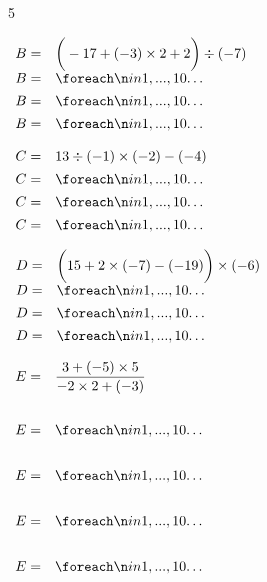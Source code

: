 \documentclass[a4paper]{book}
\begin{document}
{\begin{exerciceNote}{5}
\begin{minipage}{0.30\linewidth}
            $\begin{array}{ll}
                B = & \bigg(-17+(-3)\times2+2\bigg)\div(-7) \\[1ex]
                B = & \points[10]\\[1ex]
                B = & \points[10]\\[1ex]
                B = & \points[10]
            \end{array}$
        \end{minipage}
        \hfill
        \begin{minipage}{0.30\linewidth}
            $\begin{array}{ll}
                C = & 13\div(-1)\times(-2)-(-4) \\[1ex]
                C = & \points[10] \\[1ex]
                C = & \points[10] \\[1ex]
                C = & \points[10]
            \end{array}$

            \vspace{1cm}

            $\begin{array}{ll}
                D = & \bigg(15+2\times(-7)-(-19)\bigg)\times(-6) \\[1ex]
                D = & \points[10]\\[1ex]
                D = & \points[10]\\[1ex]
                D = & \points[10]
            \end{array}$
        \end{minipage}
        \hfill
        \begin{minipage}[t]{0.30\linewidth}
            $\begin{array}{ll}
                E = & \dfrac{3+(-5)\times5}{-2\times2+(-3)} \\ \\[2ex]
                E = & \points[10] \\ \\[2ex]
                E = & \points[10] \\ \\[2ex]
                E = & \points[10] \\ \\[2ex]
                E = & \points[10] 
            \end{array}$
        \end{minipage}
    \end{exerciceNote}


}
\end{document}
